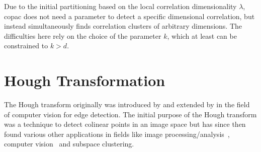 Due to the initial partitioning based on the local correlation dimensionality $\lambda$, \gls{copac} does not need a parameter to detect a specific dimensional correlation, but instead simultaneously finds correlation clusters of arbitrary dimensions. The difficulties here rely on the choice of the parameter $k$, which at least can be constrained to $k>d$.
\\




\section{Hough Transformation}\label{sec:houghintro}
The Hough transform originally was introduced by \textcite{houghOriginal1962method} and extended by \textcite{rosenfeld1969picture} in the field of computer vision for edge detection\cite{houghhistoryhart2009hough}. The initial purpose of the Hough transform was a technique to detect colinear points in an image space but has since then found various other applications in fields like image processing/analysis~\cite{rosenfeld1969picture,ballard1981generalizing}, computer vision~\cite{davies2004machine} and subspace clustering\cite{CASHachtert2008robust}.

